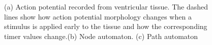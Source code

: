 \begin{figure}[!t]
\centering
\vspace{-10pt}
\label{fig:h_automatas}
\vspace{-8pt}
\caption{\small (a) Action potential recorded from ventricular tissue. The dashed lines show how action potential morphology changes when a stimulus is applied early to the tissue and how the corresponding timer values change.(b) Node automaton. (c) Path automaton}
\vspace{-10pt}
\end{figure} 

